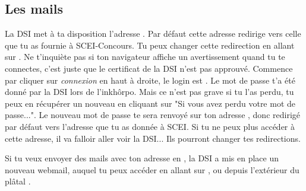 
\subsection{Les mails}

La DSI met à ta disposition l'adresse .
Par défaut cette adresse redirige vers celle que tu as fournie à SCEI-Concours.
Tu peux changer cette redirection en allant sur .
Ne t'inquiète pas si ton navigateur affiche un avertissement quand tu te connectes, c'est juste que le certificat de la DSI n'est pas approuvé.
Commence par cliquer sur \emph{connexion} en haut à droite, le login est .
Le mot de passe t'a été donné par la DSI lors de l'inkhôrpo.
Mais ce n'est pas grave si tu l'as perdu, tu peux en récupérer un nouveau en cliquant sur "Si vous avez perdu votre mot de passe...".
Le nouveau mot de passe te sera renvoyé sur ton adresse , donc redirigé par défaut vers l'adresse que tu as donnée à SCEI.
Si tu ne peux plus accéder à cette adresse, il va falloir aller voir la DSI... Ils pourront changer tes redirections.

Si tu veux envoyer des mails avec ton adresse en , la DSI a mis en place un nouveau webmail, auquel tu peux accéder en allant sur , ou depuis l'extérieur du plâtal .

